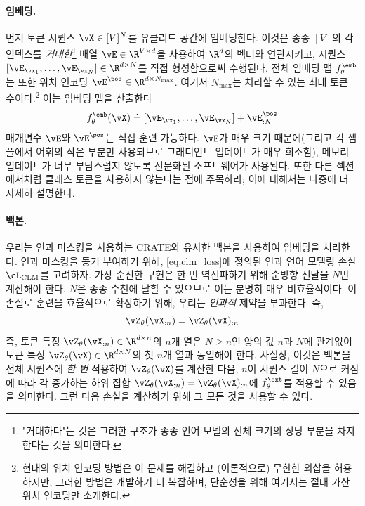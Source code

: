 \documentclass[../../book-main_ko.tex]{subfiles}
\begin{document}
\paragraph{임베딩.} 먼저 토큰 시퀀스 \(\vX \in [V]^{N}\)를 유클리드 공간에 임베딩한다. 이것은 종종 \([V]\)의 각 인덱스를 \textit{거대한}\footnote{"거대하다"는 것은 그러한 구조가 종종 언어 모델의 전체 크기의 상당 부분을 차지한다는 것을 의미한다.} 배열 \(\vE \in \R^{V \times d}\)을 사용하여 \(\R^{d}\)의 벡터와 연관시키고, 시퀀스 \([\vE_{\vx_{1}}, \dots, \vE_{\vx_{N}}] \in \R^{d \times N}\)를 직접 형성함으로써 수행된다. 전체 임베딩 맵 \(f_{\theta}^{\emb}\)는 또한 위치 인코딩 \(\vE^{\pos} \in \R^{d \times N_{\max}}\). 여기서 \(N_{\max}\)는 처리할 수 있는 최대 토큰 수이다.\footnote{현대의 위치 인코딩 방법은 이 문제를 해결하고 (이론적으로) 무한한 외삽을 허용하지만, 그러한 방법은 개발하기 더 복잡하며, 단순성을 위해 여기서는 절대 가산 위치 인코딩만 소개한다.} 이는 임베딩 맵을 산출한다
\begin{equation}
    f_{\theta}^{\emb}(\vX) \doteq [\vE_{\vx_{1}}, \dots, \vE_{\vx_{N}}] + \vE_{:N}^{\pos}
\end{equation}
매개변수 \(\vE\)와 \(\vE^{\pos}\)는 직접 훈련 가능하다. \(\vE\)가 매우 크기 때문에(그리고 각 샘플에서 어휘의 작은 부분만 사용되므로 그래디언트 업데이트가 매우 희소함), 메모리 업데이트가 너무 부담스럽지 않도록 전문화된 소프트웨어가 사용된다. 또한 다른 섹션에서처럼 클래스 토큰을 사용하지 않는다는 점에 주목하라; 이에 대해서는 나중에 더 자세히 설명한다.

\paragraph{백본.} 우리는 인과 마스킹을 사용하는 CRATE와 유사한 백본을 사용하여 임베딩을 처리한다. 인과 마스킹을 동기 부여하기 위해, \eqref{eq:clm_loss}에 정의된 인과 언어 모델링 손실 \(\cL_{\mathrm{CLM}}\)를 고려하자. 가장 순진한 구현은 한 번 역전파하기 위해 순방향 전달을 \(N\)번 계산해야 한다. \(N\)은 종종 수천에 달할 수 있으므로 이는 분명히 매우 비효율적이다. 이 손실로 훈련을 효율적으로 확장하기 위해, 우리는 \textit{인과적} 제약을 부과한다. 즉,
\begin{equation}\label{eq:causal_backbone_def}
    \vZ_{\theta}(\vX_{:n}) = \vZ_{\theta}(\vX)_{:n}
\end{equation}
즉, 토큰 특징 \(\vZ_{\theta}(\vX_{:n}) \in \R^{d \times n}\)의 \(n\)개 열은 \(N \geq n\)인 양의 값 \(n\)과 \(N\)에 관계없이 토큰 특징 \(\vZ_{\theta}(\vX) \in \R^{d \times N}\)의 첫 \(n\)개 열과 동일해야 한다. 사실상, 이것은 백본을 전체 시퀀스에 \textit{한 번} 적용하여 \(\vZ_{\theta}(\vX)\)를 계산한 다음, \(n\)이 시퀀스 길이 \(N\)으로 커짐에 따라 각 증가하는 하위 집합 \(\vZ_{\theta}(\vX_{:n}) = \vZ_{\theta}(\vX)_{:n}\)에 \(f_{\theta}^{\ext}\)를 적용할 수 있음을 의미한다. 그런 다음 손실을 계산하기 위해 그 모든 것을 사용할 수 있다.
\end{document}

